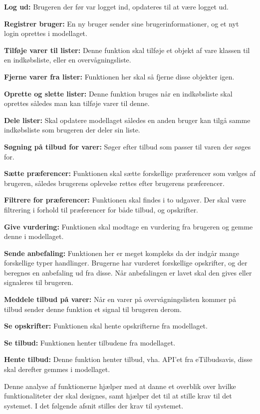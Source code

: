 \textbf{Log ud:} Brugeren der før var logget ind, opdateres til at være logget ud.

\textbf{Registrer bruger:} En ny bruger sender sine brugerinformationer, og et nyt login oprettes i modellaget.

\textbf{Tilføje varer til lister:} Denne funktion skal tilføje et objekt af vare klassen til en indkøbsliste, eller en overvågningsliste.

\textbf{Fjerne varer fra lister:} Funktionen her skal så fjerne disse objekter igen.

\textbf{Oprette og slette lister:} Denne funktion bruges når en indkøbsliste skal oprettes således man kan tilføje varer til denne.

\textbf{Dele lister:} Skal opdatere modellaget således en anden bruger kan tilgå samme indkøbsliste som brugeren der deler sin liste.

\textbf{Søgning på tilbud for varer:} Søger efter tilbud som passer til varen der søges for.

\textbf{Sætte præferencer:} Funktionen skal sætte forskellige præferencer som vælges af brugeren, således brugerens oplevelse rettes efter brugerens præferencer.

\textbf{Filtrere for præferencer:} Funktionen skal findes i to udgaver. Der skal være filtrering i forhold til præferencer for både tilbud, og opskrifter.

\textbf{Give vurdering:} Funktionen skal modtage en vurdering fra brugeren og gemme denne i modellaget.

\textbf{Sende anbefaling:} Funktionen her er meget kompleks da der indgår mange forskellige typer handlinger.
Brugerne har vurderet forskellige opskrifter, og der beregnes en anbefaling ud fra disse.
Når anbefalingen er lavet skal den gives eller signaleres til brugeren.

\textbf{Meddele tilbud på varer:} Når en varer på overvågningslisten kommer på tilbud sender denne funktion et signal til brugeren derom.

\textbf{Se opskrifter:} Funktionen skal hente opskrifterne fra modellaget.

\textbf{Se tilbud:} Funktionen henter tilbudene fra modellaget.

\textbf{Hente tilbud:} Denne funktion henter tilbud, vha. API'et fra eTilbudsavis, disse skal derefter gemmes i modellaget.

Denne analyse af funktionerne hjælper med at danne et overblik over hvilke funktionaliteter der skal designes, samt hjælper det til at stille krav til det systemet.
I det følgende afsnit stilles der krav til systemet.
